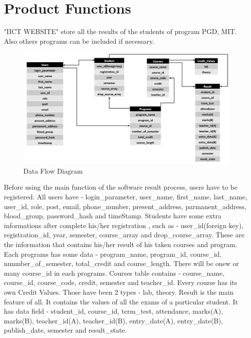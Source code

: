 \documentclass{scrreprt}
\begin{document}
	\section{Product Functions}
	"IICT WEBSITE" store all the results of the students of program PGD, MIT. Also others programs can be included if necessary.
	\begin{figure}[h!]
		\centering
		\includegraphics[width=15cm]{3.JPG}
		\caption{Data Flow Diagram}
		\label{fig:Data Flow Diagram}
	\end{figure}
	Before using the main function of the software result process, users have to be registered. 
	\newline
	All users have - login\_parameter, user\_name, first\_name, last\_name, user\_id, role, post, email, phone\_number, present\_address, parmanent\_address, blood\_group, password\_hash and timeStamp.
	\newline
	Students have some extra informations after complete his/her registration , such as - user\_id(foreign key), registration\_id, year, semester, course\_array and drop\_course\_array. These are the information that contains his/her result of his taken courses and program.
	\newline
	Each programs has some data - program\_name, program\_id, course\_id, nunmber\_of\_semester, total\_credit and course\_length. There will be onew or many course\_id in each programs.
	\newline
	Courses table contains - course\_name, course\_id, course\_code, credit, semester and teacher\_id.
	\newline
	Every course has its own Credit Values. Those have been 2 types - lab, theory.
	\newline
	Result is the main feature of all. It contains the values of all the exams of a particular student. It has data field - student\_id, course\_id, term\_test, attendance, marks(A), marks(B), teacher\_id(A), teacher\_id(B), entry\_date(A), entry\_date(B), publish\_date, semester	and result\_state.
	
\end{document}
